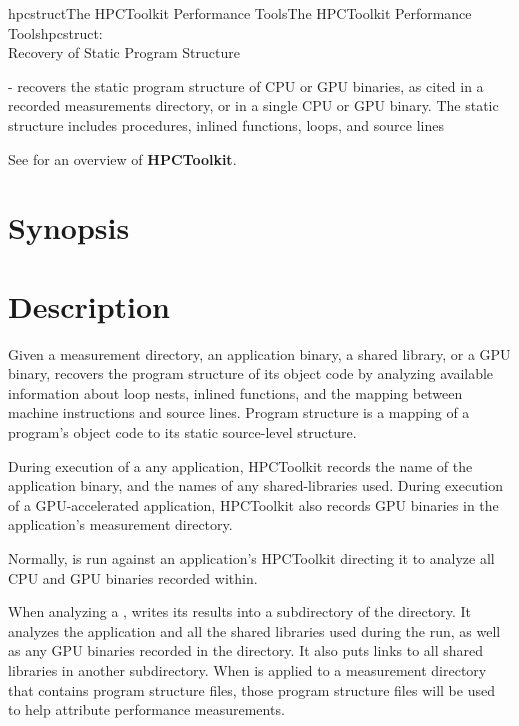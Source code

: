 \documentclass[english]{article}
\begin{document}
\begin{Name}{1}{hpcstruct}{The HPCToolkit Performance Tools}{The HPCToolkit Performance Tools}{hpcstruct:\\ Recovery of Static Program Structure}

 - recovers the static program structure of CPU or GPU binaries, as cited in a recorded measurements directory, or
in a single CPU or GPU binary.
The static structure includes procedures, inlined functions, loops, and source lines

See  for an overview of \textbf{HPCToolkit}.

\end{Name}

\section{Synopsis}

  

  

\section{Description}

Given a measurement directory, an application binary, a shared library, or a GPU binary, 
recovers the program structure of its object code by analyzing available information
about loop nests, inlined functions, and the mapping between machine instructions and 
source lines.  Program structure is a mapping of a program's object code to its static source-level structure.

During execution of a any application, HPCToolkit records the name of the application binary,
and the names of any shared-libraries used.
During execution of a GPU-accelerated application, HPCToolkit also records GPU binaries
in the application's measurement directory.

Normally,  is run against an application's HPCToolkit  directing
it to analyze all CPU and GPU binaries recorded within.

When analyzing a ,   writes its results into a subdirectory of the directory.
It analyzes the application and all the shared libraries used during the run, as well as any
GPU binaries recorded in the directory.  It also puts links to all shared libraries in another subdirectory.
When  is applied to a measurement directory that contains program structure files,
those program structure files will be used to help attribute performance measurements.
\end{document}
